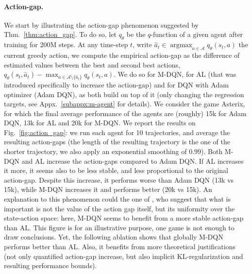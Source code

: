 \documentclass{article}
\DeclareMathOperator*{\argmax}{argmax}
\newcommand{\actions}{\mathcal{A}}
\begin{document}
\paragraph{Action-gap.}
We start by illustrating the action-gap phenomenon suggested by Thm.~\ref{thm:action_gap}. To do so, let $q_\theta$ be the $q$-function of a given agent after training for 200M steps. At any time-step $t$, write $\hat{a}_t \in \argmax_{a\in\actions}q_\theta(s_t,a)$ the current greedy action, we compute the empirical action-gap as the difference of estimated values between the best and second best actions, $q_\theta(s_t, \hat{a}_t) - \max_{a\in\actions \setminus \{\hat{a}_t\}} q_\theta(s_t,a)$. We do so for M-DQN, for AL (that was introduced specifically to increase the action-gap) and for DQN with Adam optimizer (Adam DQN), as both build on top of it (only changing the regression targets, see Appx.~\ref{subappx:m-agent} for details). We consider the game Asterix, for which the final average performance of the agents are (roughly) 15k for Adam DQN, 13k for AL and 20k for M-DQN.
We report the results on Fig.~\ref{fig:action_gap}: we run each agent for 10 trajectories, and average the resulting action-gaps (the length of the resulting trajectory is the one of the shorter trajectory, we also apply an exponential smoothing of $0.99$).
Both M-DQN and AL increase the action-gaps compared to Adam DQN. If AL increases it more, it seems also to be less stable, and less proportional to the original action-gap. Despite this increase, it performs worse than Adam DQN (13k vs 15k), while M-DQN increases it and performs better (20k vs 15k). An explanation to this phenomenon could the one of \citet{van2019using}, who suggest that what is important is not the value of the action gap itself, but its uniformity over the state-action space: here, M-DQN seems to benefit from a more stable action-gap than AL.
This figure is for an illustrative purpose, one game is not enough to draw conclusions. Yet, the following ablation shows that globally M-DQN performs better than AL. Also, it benefits from more theoretical justifications (not only quantified action-gap increase, but also implicit KL-regularization and resulting performance bounds).
\end{document}
